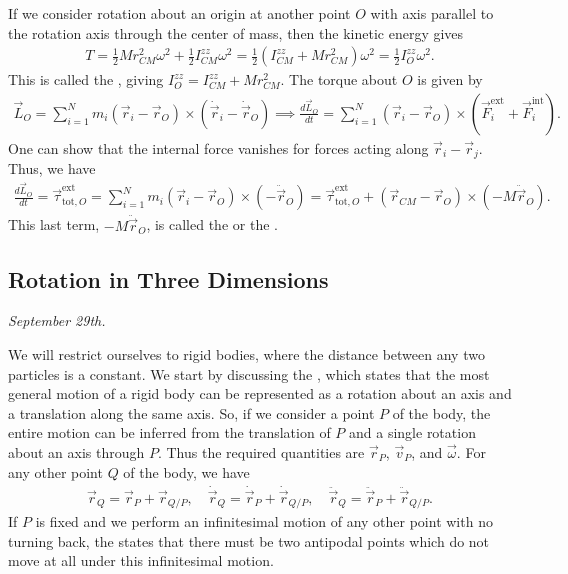If we consider rotation about an origin at another point $O$ with axis parallel to the rotation axis through the center of mass, then the kinetic energy gives
\begin{align}
    T = \frac{1}{2} M r_{CM}^{2} \omega^{2} + \frac{1}{2} I_{CM}^{zz} \omega^{2} = \frac{1}{2} (I_{CM}^{zz} + M r_{CM}^{2}) \omega^{2} = \frac{1}{2} I_{O}^{zz} \omega^{2}.
\end{align}
This is called the , giving $I_{O}^{zz} = I_{CM}^{zz} + M r_{CM}^{2}$. The torque about $O$ is given by
\begin{align}
    \vec{L}_{O} = \sum_{i=1}^{N} m_{i}(\vec{r}_{i} - \vec{r}_{O}) \times (\dot{\vec{r}}_{i} - \dot{\vec{r}}_{O}) \implies \frac{d \vec{L}_{O}}{dt} = \sum_{i=1}^{N} (\vec{r}_{i} - \vec{r}_{O}) \times (\vec{F}_{i}^{\text{ext}} + \vec{F}_{i}^{\text{int}}).
\end{align}
One can show that the internal force vanishes for forces acting along $\vec{r}_{i} - \vec{r}_{j}$. Thus, we have
\begin{align}
    \frac{d \vec{L}_{O}}{dt} = \vec{\tau}_{\text{tot},O}^{\text{ext}} = \sum_{i=1}^{N} m_{i}(\vec{r}_{i}-\vec{r}_{O}) \times (-\ddot{\vec{r}}_{O}) = \vec{\tau}_{\text{tot},O}^{\text{ext}} + (\vec{r}_{CM} - \vec{r}_{O}) \times (-M \ddot{\vec{r}}_{O}).
\end{align}
This last term, $-M\ddot{\vec{r}}_{O}$, is called the  or the .

\subsection{Rotation in Three Dimensions}
\textit{September 29th.}

We will restrict ourselves to rigid bodies, where the distance between any two particles is a constant. We start by discussing the , which states that the most general motion of a rigid body can be represented as a rotation about an axis and a translation along the same axis. So, if we consider a point $P$ of the body, the entire motion can be inferred from the translation of $P$ and a single rotation about an axis through $P$. Thus the required quantities are $\vec{r}_{P}$, $\vec{v}_{P}$, and $\vec{\omega}$. For any other point $Q$ of the body, we have
\begin{align}
    \vec{r}_{Q} = \vec{r}_{P} + \vec{r}_{Q/P}, \quad \dot{\vec{r}}_{Q} = \dot{\vec{r}}_{P} + \dot{\vec{r}}_{Q/P}, \quad \ddot{\vec{r}}_{Q} = \ddot{\vec{r}}_{P} + \ddot{\vec{r}}_{Q/P}.
\end{align}
If $P$ is fixed and we perform an infinitesimal motion of any other point with no turning back, the  states that there must be two antipodal points which do not move at all under this infinitesimal motion.

